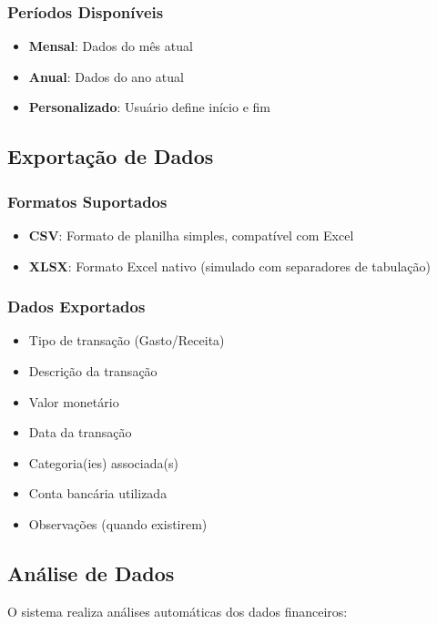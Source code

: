 \documentclass[12pt,a4paper]{article}
\begin{document}
\subsubsection*{Períodos Disponíveis}
\begin{itemize}
  \item \textbf{Mensal}: Dados do mês atual
  \item \textbf{Anual}: Dados do ano atual
  \item \textbf{Personalizado}: Usuário define início e fim
\end{itemize}

\subsection{Exportação de Dados}

\subsubsection*{Formatos Suportados}
\begin{itemize}
  \item \textbf{CSV}: Formato de planilha simples, compatível com Excel
  \item \textbf{XLSX}: Formato Excel nativo (simulado com separadores de tabulação)
\end{itemize}

\subsubsection*{Dados Exportados}
\begin{itemize}
  \item Tipo de transação (Gasto/Receita)
  \item Descrição da transação
  \item Valor monetário
  \item Data da transação
  \item Categoria(ies) associada(s)
  \item Conta bancária utilizada
  \item Observações (quando existirem)
\end{itemize}

\subsection{Análise de Dados}

O sistema realiza análises automáticas dos dados financeiros:
\end{document}
